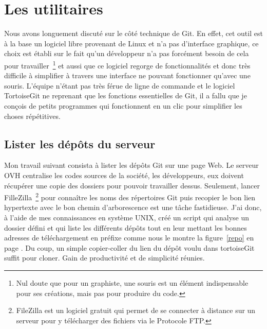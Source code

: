 \section{Les utilitaires} %
\label{sec:Les utilitaires}

Nous avons longuement discuté sur le côté technique de Git. En effet,
cet outil est à la base un logiciel libre provenant de Linux et n'a pas
d'interface graphique, ce choix est établi sur le fait qu'un développeur
n'a pas forcément besoin de cela pour travailler\, \footnote{Nul doute
que pour un graphiste, une souris est un élément indispensable pour ses
créations, mais pas pour produire du code.} et aussi que ce logiciel
regorge de fonctionnalités et donc très difficile à simplifier à travers
une interface ne pouvant fonctionner qu'avec une souris.  L'équipe
n'étant pas très férue de ligne de commande et le logiciel TortoiseGit
ne reprenant que les fonctions essentielles de Git, il a fallu que je
conçois de petits programmes qui fonctionnent en un clic pour simplifier
les choses répétitives.

\subsection{Lister les dépôts du serveur} %
\label{sub:Lister les dépôts du serveur}

Mon travail suivant consista à lister les dépôts Git sur une page Web.
Le serveur OVH centralise les codes sources de la société, les
développeurs, eux doivent récupérer une copie des dossiers pour pouvoir
travailler dessus. Seulement, lancer FilleZilla\, \footnote{FileZilla
est un logiciel gratuit qui permet de se connecter à distance sur un
serveur pour y télécharger des fichiers via le Protocole FTP.} pour
connaître les noms des répertoires Git puis recopier le bon lien
hypertexte avec le bon chemin d'arborescence est une tâche fastidieuse.
J'ai donc, à l'aide de mes connaissances en système UNIX, créé un script
qui analyse un dossier défini et qui liste les différents dépôts tout en
leur mettant les bonnes adresses de téléchargement en préfixe comme nous
le montre la figure~\ref{repo} en page \pageref{repo}. Du coup, un
simple copier-coller du lien du dépôt voulu dans tortoiseGit suffit pour
cloner. Gain de productivité et de simplicité réunies.

